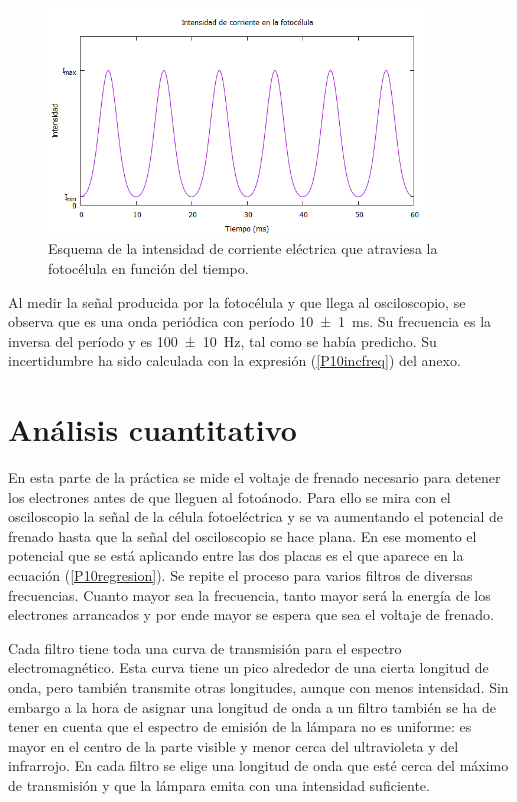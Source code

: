 \documentclass[12pt]{article}
\numberwithin{table}{section}
\numberwithin{figure}{section}
\numberwithin{equation}{section}
\newcommand{\data}[3]{\SI{#1 \pm #2}{#3}}
\begin{document}
\begin{figure}[!ht]
	\begin{center}
		\includegraphics[width=10cm]{P10Intensidadfotocelula.png}
		\caption{Esquema de la intensidad de corriente eléctrica que atraviesa la fotocélula en función del tiempo.}\label{P10intensidadfotocelula}
	\end{center}
\end{figure}

Al medir la señal producida por la fotocélula y que llega al osciloscopio, se observa que es una onda periódica con período \data{10}{1}{ms}. Su frecuencia es la inversa del período y es \data{100}{10}{Hz}, tal como se había predicho. Su incertidumbre ha sido calculada con la expresión (\ref{P10incfreq}) del anexo.

\section{Análisis cuantitativo}
En esta parte de la práctica se mide el voltaje de frenado  necesario para detener los electrones antes de que lleguen al fotoánodo. Para ello se mira con el osciloscopio la señal de la célula fotoeléctrica y se va aumentando el potencial de frenado hasta que la señal del osciloscopio se hace plana. En ese momento el potencial que se está aplicando entre las dos placas es el que aparece en la ecuación (\ref{P10regresion}). Se repite el proceso para varios filtros de diversas frecuencias. Cuanto mayor sea la frecuencia, tanto mayor será la energía de los electrones arrancados y por ende mayor se espera que sea el voltaje de frenado.

Cada filtro tiene toda una curva de transmisión para el espectro electromagnético. Esta curva tiene un pico alrededor de una cierta longitud de onda, pero también transmite otras longitudes, aunque con menos intensidad. Sin embargo a la hora de asignar una longitud de onda a un filtro también se ha de tener en cuenta que el espectro de emisión de la lámpara no es uniforme: es mayor en el centro de la parte visible y menor cerca del ultravioleta y del infrarrojo. En cada filtro se elige una longitud de onda que esté cerca del máximo de transmisión y que la lámpara emita con una intensidad suficiente.
\end{document}
